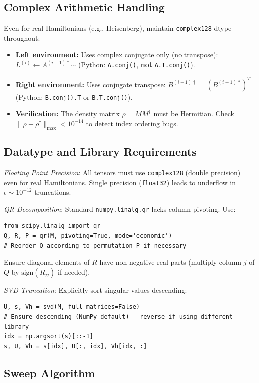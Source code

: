 \documentclass[aps,prb,onecolumn,scriptaddress]{revtex4-2}
\begin{document}
\subsection{Complex Arithmetic Handling}
Even for real Hamiltonians (e.g., Heisenberg), maintain \texttt{complex128} dtype throughout:
\begin{itemize}
\item \textbf{Left environment:} Uses complex conjugate only (no transpose):
$L^{(i)} \gets A^{(i-1)*} \cdots$ (Python: \texttt{A.conj()}, \textbf{not} \texttt{A.T.conj()}).
\item \textbf{Right environment:} Uses conjugate transpose: $B^{(i+1)\dagger} = (B^{(i+1)*})^T$ 
(Python: \texttt{B.conj().T} or \texttt{B.T.conj()}).
\item \textbf{Verification:} The density matrix $\rho = M M^\dagger$ must be Hermitian. 
Check $\|\rho - \rho^\dagger\|_{\max} < 10^{-14}$ to detect index ordering bugs.
\end{itemize}

\subsection{Datatype and Library Requirements}

\textit{Floating Point Precision}: All tensors must use \texttt{complex128} (double precision) even for real Hamiltonians. Single precision (\texttt{float32}) leads to underflow in $\epsilon \sim 10^{-12}$ truncations.

\textit{QR Decomposition}: Standard \texttt{numpy.linalg.qr} lacks column-pivoting. Use:
\begin{verbatim}
from scipy.linalg import qr
Q, R, P = qr(M, pivoting=True, mode='economic')
# Reorder Q according to permutation P if necessary
\end{verbatim}
Ensure diagonal elements of $R$ have non-negative real parts (multiply column $j$ of $Q$ by $\text{sign}(R_{jj})$ if needed).

\textit{SVD Truncation}: Explicitly sort singular values descending:
\begin{verbatim}
U, s, Vh = svd(M, full_matrices=False)
# Ensure descending (NumPy default) - reverse if using different library
idx = np.argsort(s)[::-1]
s, U, Vh = s[idx], U[:, idx], Vh[idx, :]
\end{verbatim}

\subsection{Sweep Algorithm}
\end{document}
